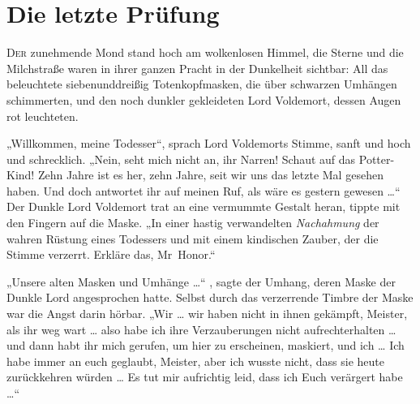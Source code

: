 \chapter{Die letzte Prüfung}

\lettrine{D}{er} zunehmende Mond stand hoch am wolkenlosen Himmel, die Sterne und die Milchstraße waren in ihrer ganzen Pracht in der Dunkelheit sichtbar: All das beleuchtete siebenunddreißig Totenkopfmasken, die über schwarzen Umhängen schimmerten, und den noch dunkler gekleideten Lord Voldemort, dessen Augen rot leuchteten.

„Willkommen, meine Todesser“, sprach Lord Voldemorts Stimme, sanft und hoch und schrecklich.
„Nein, seht mich nicht an, ihr Narren! Schaut auf das Potter-Kind! Zehn Jahre ist es her, zehn Jahre, seit wir uns das letzte Mal gesehen haben. Und doch antwortet ihr auf meinen Ruf, als wäre es gestern gewesen …“
Der Dunkle Lord Voldemort trat an eine vermummte Gestalt heran, tippte mit den Fingern auf die Maske.
„In einer hastig verwandelten \emph{Nachahmung} der wahren Rüstung eines Todessers und mit einem kindischen Zauber, der die Stimme verzerrt. Erkläre das, Mr~Honor.“

„Unsere alten Masken und Umhänge …“ , sagte der Umhang, deren Maske der Dunkle Lord angesprochen hatte. Selbst durch das verzerrende Timbre der Maske war die Angst darin hörbar.
„Wir … wir haben nicht in ihnen gekämpft, Meister, als ihr weg wart … also habe ich ihre Verzauberungen nicht aufrechterhalten … und dann habt ihr mich gerufen, um hier zu erscheinen, maskiert, und ich … Ich habe immer an euch geglaubt, Meister, aber ich wusste nicht, dass sie heute zurückkehren würden … Es tut mir aufrichtig leid, dass ich Euch verärgert habe …“

